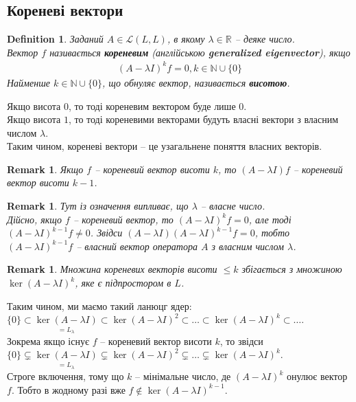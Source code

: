 \documentclass[a4paper, 10pt]{article}
\theoremstyle{theoremdd}
\newtheorem{definition}[theorem]{Definition}
\newtheorem{remark}[theorem]{Remark}
\begin{document}
\subsection{Кореневі вектори}
\begin{definition}
Заданий $A \in \mathcal{L}(L,L)$, в якому $\lambda \in \mathbb{R}$ -- деяке число.\\
Вектор $f$ називається \textbf{кореневим} (англійською \textbf{generalized eigenvector}), якщо
\begin{align*}
(A-\lambda I)^k f = 0, k \in \mathbb{N} \cup \{0\}
\end{align*}
Найменше $k \in \mathbb{N} \cup \{0\}$, що обнуляє вектор, називається \textbf{висотою}.
\end{definition}
\noindent
Якщо висота $0$, то тоді кореневим вектором буде лише $0$.\\
Якщо висота $1$, то тоді кореневими векторами будуть власні вектори з власним числом $\lambda$.\\
Таким чином, кореневі вектори -- це узагальнене поняття власних векторів.

\begin{remark}
Якщо $f$ -- кореневий вектор висоти $k$, то $(A-\lambda I)f$ -- кореневий вектор висоти $k-1$.
\end{remark}

\begin{remark}
Тут із означення випливає, що $\lambda$ -- власне число. \\
Дійсно, якщо $f$ -- кореневий вектор, то $(A-\lambda I)^k f = 0$, але тоді $(A-\lambda I)^{k-1} f \neq 0$. Звідси $(A-\lambda I) (A-\lambda I)^{k-1} f = 0$, тобто $(A-\lambda I)^{k-1} f$ -- власний вектор оператора $A$ з власним числом $\lambda$.
\end{remark}

\begin{remark}
Множина кореневих векторів висоти $\leq k$ збігається з множиною $\ker(A-\lambda I)^k$, яке є підпростором в $L$.
\end{remark}
\noindent
Таким чином, ми маємо такий ланюцг ядер:\\
$\{0\} \subset \underset{= L_\lambda}{\ker(A-\lambda I)} \subset \ker(A-\lambda I)^2 \subset \dots \subset \ker(A-\lambda I)^k \subset \dots$.\\
Зокрема якщо існує $f$ -- кореневий вектор висоти $k$, то звідси\\
$\{0\} \subsetneq \underset{= L_\lambda}{\ker(A-\lambda I)} \subsetneq \ker(A-\lambda I)^2 \subsetneq \dots \subsetneq \ker(A-\lambda I)^k$.\\
Строге включення, тому що $k$ -- мінімальне число, де $(A-\lambda I)^k$ онулює вектор $f$. Тобто в жодному разі вже $f \notin \ker(A-\lambda I)^{k-1}$.
\end{document}
